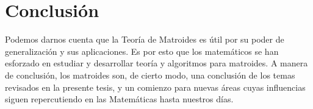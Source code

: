 \section{Conclusión}
Podemos darnos cuenta que la Teoría de Matroides es útil por su poder de generalización y sus aplicaciones. Es por esto que los matemáticos se han esforzado en estudiar y desarrollar teoría y algoritmos para matroides. A manera de conclusión, los matroides son, de cierto modo, una conclusión de los temas revisados en la presente tesis, y un comienzo para nuevas áreas cuyas influencias siguen repercutiendo en las Matemáticas hasta nuestros días.